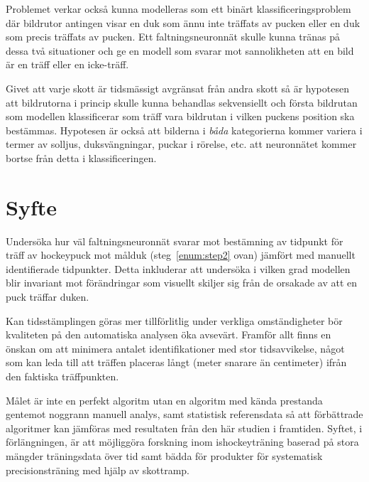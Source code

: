 \documentclass[a4paper,12pt]{article}
\begin{document}
Problemet verkar också kunna modelleras som ett binärt klassificeringsproblem
där bildrutor antingen visar en duk som ännu inte träffats av pucken eller
en duk som precis träffats av pucken. Ett faltningsneuronnät skulle
kunna tränas på dessa två situationer och ge en modell som svarar mot
sannolikheten att en bild är en träff eller en icke-träff.

Givet att varje skott är tidsmässigt avgränsat från andra skott så är
hypotesen att bildrutorna i princip skulle kunna behandlas sekvensiellt och
första bildrutan som modellen klassificerar som träff vara bildrutan i
vilken puckens position ska bestämmas. Hypotesen är också att bilderna
i \textit{båda} kategorierna kommer variera i termer av solljus,
duksvängningar, puckar i rörelse, etc. att neuronnätet kommer bortse från
detta i klassificeringen.


\section*{Syfte}
Undersöka hur väl faltningsneuronnät svarar mot bestämning av tidpunkt för
träff av hockeypuck mot målduk (steg~\ref{enum:step2} ovan) jämfört med
manuellt identifierade tidpunkter. Detta inkluderar att undersöka i vilken
grad modellen blir invariant mot förändringar som visuellt skiljer sig från de
orsakade av att en puck träffar duken.

Kan tidsstämplingen göras mer tillförlitlig under verkliga omständigheter bör
kvaliteten på den automatiska analysen öka avsevärt. Framför allt finns en
önskan om att minimera antalet identifikationer med stor tidsavvikelse, något
som kan leda till att träffen placeras långt (meter snarare än centimeter)
ifrån den faktiska träffpunkten.

Målet är inte en perfekt algoritm utan en algoritm med kända prestanda
gentemot noggrann manuell analys, samt statistisk referensdata så att
förbättrade algoritmer kan jämföras med resultaten från den här studien i
framtiden. Syftet, i förlängningen, är att möjliggöra forskning inom
ishockeyträning baserad på stora mängder träningsdata över tid samt bädda för
produkter för systematisk precisionsträning med hjälp av skottramp.
\end{document}
